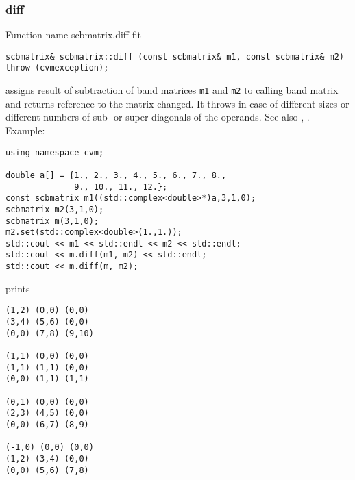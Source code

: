 \subsubsection{diff}
Function%
\pdfdest name {scbmatrix.diff} fit
\begin{verbatim}
scbmatrix& scbmatrix::diff (const scbmatrix& m1, const scbmatrix& m2)
throw (cvmexception);
\end{verbatim}
assigns  result of subtraction of
band matrices \verb"m1" and \verb"m2" to  calling band matrix
and returns  reference to
the matrix changed.
It throws  
in case of different sizes or different numbers of sub- or super-diagonals
of the operands.
See also ,
.
Example:
\begin{Verbatim}
using namespace cvm;

double a[] = {1., 2., 3., 4., 5., 6., 7., 8.,
              9., 10., 11., 12.};
const scbmatrix m1((std::complex<double>*)a,3,1,0);
scbmatrix m2(3,1,0);
scbmatrix m(3,1,0);
m2.set(std::complex<double>(1.,1.));
std::cout << m1 << std::endl << m2 << std::endl;
std::cout << m.diff(m1, m2) << std::endl;
std::cout << m.diff(m, m2);
\end{Verbatim}
prints
\begin{Verbatim}
(1,2) (0,0) (0,0)
(3,4) (5,6) (0,0)
(0,0) (7,8) (9,10)

(1,1) (0,0) (0,0)
(1,1) (1,1) (0,0)
(0,0) (1,1) (1,1)

(0,1) (0,0) (0,0)
(2,3) (4,5) (0,0)
(0,0) (6,7) (8,9)

(-1,0) (0,0) (0,0)
(1,2) (3,4) (0,0)
(0,0) (5,6) (7,8)
\end{Verbatim}
\newpage




